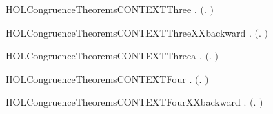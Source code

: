 \newcommand{\HOLCongruenceTheoremsCONTEXTTwo}{\UseVerbatim{HOLCongruenceTheoremsCONTEXTTwo}}
\begin{SaveVerbatim}{HOLCongruenceTheoremsCONTEXTThree}
\HOLTokenTurnstile{} \HOLSymConst{\HOLTokenForall{}} .   \HOLSymConst{\HOLTokenImp{}}  \ensuremath{(}\HOLTokenLambda{}. \HOLSymConst{\ensuremath{\ldotp}} \ensuremath{)}
\end{SaveVerbatim}
\newcommand{\HOLCongruenceTheoremsCONTEXTThree}{\UseVerbatim{HOLCongruenceTheoremsCONTEXTThree}}
\begin{SaveVerbatim}{HOLCongruenceTheoremsCONTEXTThreeXXbackward}
\HOLTokenTurnstile{} \HOLSymConst{\HOLTokenForall{}} .  \ensuremath{(}\HOLTokenLambda{}. \HOLSymConst{\ensuremath{\ldotp}} \ensuremath{)} \HOLSymConst{\HOLTokenImp{}}  
\end{SaveVerbatim}
\newcommand{\HOLCongruenceTheoremsCONTEXTThreeXXbackward}{\UseVerbatim{HOLCongruenceTheoremsCONTEXTThreeXXbackward}}
\begin{SaveVerbatim}{HOLCongruenceTheoremsCONTEXTThreea}
\HOLTokenTurnstile{} \HOLSymConst{\HOLTokenForall{}}.  \ensuremath{(}\HOLTokenLambda{}. \HOLSymConst{\ensuremath{\ldotp}}\ensuremath{)}
\end{SaveVerbatim}
\newcommand{\HOLCongruenceTheoremsCONTEXTThreea}{\UseVerbatim{HOLCongruenceTheoremsCONTEXTThreea}}
\begin{SaveVerbatim}{HOLCongruenceTheoremsCONTEXTFour}
\HOLTokenTurnstile{} \HOLSymConst{\HOLTokenForall{}} .   \HOLSymConst{\HOLTokenConj{}}   \HOLSymConst{\HOLTokenImp{}}  \ensuremath{(}\HOLTokenLambda{}.   \HOLSymConst{\ensuremath{+}}  \ensuremath{)}
\end{SaveVerbatim}
\newcommand{\HOLCongruenceTheoremsCONTEXTFour}{\UseVerbatim{HOLCongruenceTheoremsCONTEXTFour}}
\begin{SaveVerbatim}{HOLCongruenceTheoremsCONTEXTFourXXbackward}
\HOLTokenTurnstile{} \HOLSymConst{\HOLTokenForall{}} .  \ensuremath{(}\HOLTokenLambda{}.   \HOLSymConst{\ensuremath{+}}  \ensuremath{)} \HOLSymConst{\HOLTokenImp{}}   \HOLSymConst{\HOLTokenConj{}}  
\end{SaveVerbatim}
